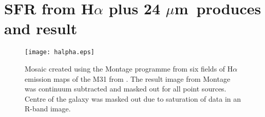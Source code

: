 \documentclass[useAMS,usenatbib]{mn2e}
\newcommand \um    {$\mu$m\ }
\begin{document}
\appendix
\section{SFR from H$\alpha$ plus 24 \um produces and result}
\label{app:halpha}

\begin{figure*}
\centering
\texttt{[image: halpha.eps]}
\caption{Mosaic created using the Montage programme from six fields of H$\alpha$ emission maps of the M31 from \cite{Massey07}. The result image from Montage was continuum subtracted and masked out for all point sources. Centre of the galaxy was masked out due to saturation of data in an R-band image.}
\label{fig:halpha}
\end{figure*}
\end{document}

